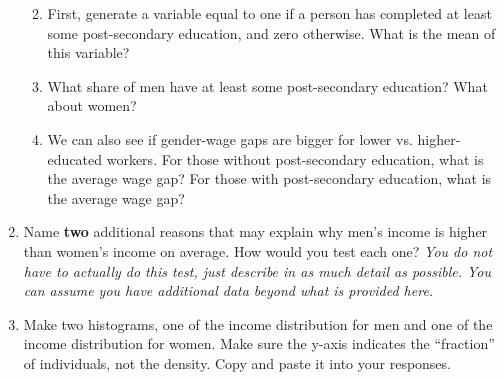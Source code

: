 \documentclass[11pt]{article}
\begin{document}
\begin{enumerate}
  \begin{enumerate}
  \def\labelenumii{\arabic{enumii}.}
  \item
    First, generate a variable equal to one if a person has completed at
    least some post-secondary education, and zero otherwise. What is the
    mean of this variable?
  \item
    What share of men have at least some post-secondary education? What
    about women?
  \item
    We can also see if gender-wage gaps are bigger for lower vs.
    higher-educated workers. For those without post-secondary education,
    what is the average wage gap? For those with post-secondary
    education, what is the average wage gap?
  \end{enumerate}
\item
  Name \textbf{two} additional reasons that may explain why men's income
  is higher than women's income on average. How would you test each one?
  \emph{You do not have to actually do this test, just describe in as
  much detail as possible. You can assume you have additional data
  beyond what is provided here.}
\item
  Make two histograms, one of the income distribution for men and one of
  the income distribution for women. Make sure the y-axis indicates the
  ``fraction'' of individuals, not the density. Copy and paste it into
  your responses.
\end{enumerate}
\end{document}
